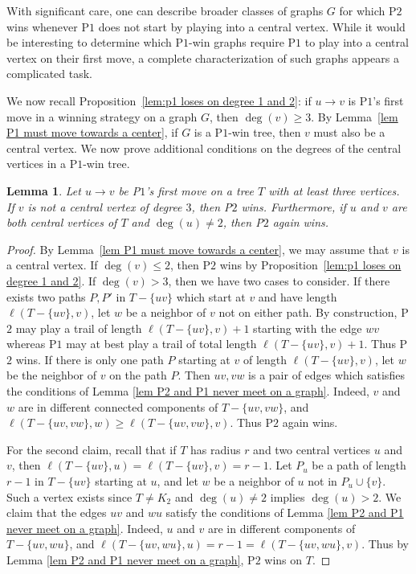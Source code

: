 \documentclass{article}
\theoremstyle{plain}
\newtheorem{lemma}[theorem]{Lemma}
\theoremstyle{definition}
\newcommand{\MaxTrail}{\ell}
\def\pone{{\rm{P}\ensuremath{1}}}
\def\ptwo{{\rm{P}\ensuremath{2}}}
\def\poneposs{{\rm{P}\ensuremath{1}'s}}
\begin{document}
With significant care, one can describe broader classes of graphs $G$ for which \ptwo{} wins whenever \pone{} does not start by playing into a central vertex.
While it would be interesting to determine which \pone{}-win graphs require \pone{} to play into a central vertex on their first move, a complete characterization of such graphs appears a complicated task.

We now recall Proposition~\ref{lem:p1 loses on degree 1 and 2}: if $u \to v$ is \poneposs{} first move in a winning strategy on a graph $G$, then $\deg(v) \geq 3$.
By Lemma~\ref{lem P1 must move towards a center}, if $G$ is a \pone{}-win tree, then $v$ must also be a central vertex.
We now prove additional conditions on the degrees of the central vertices in a \pone{}-win tree.

\begin{lemma}\label{lemma central vertices general}
    Let $u\to v$ be \poneposs{} first move on a tree $T$ with at least three vertices. If $v$ is not a central vertex of degree $3$, then \ptwo{} wins. Furthermore, if $u$ and $v$ are both central vertices of $T$ and $\deg(u) \neq 2$, then \ptwo{} again wins.
\end{lemma}
\begin{proof}
    By Lemma~\ref{lem P1 must move towards a center}, we may assume that $v$ is a central vertex. If $\deg(v) \leq 2$, then \ptwo{} wins by Proposition~\ref{lem:p1 loses on degree 1 and 2}. If $\deg(v) > 3$, then we have two cases to consider. If there exists two paths $P,P'$ in $T - \{uv\}$ which start at $v$ and have length $\MaxTrail(T - \{uv\},v)$, let $w$ be a neighbor of $v$ not on either path. By construction, \ptwo{} may play a trail of length $\MaxTrail(T - \{uv\}, v) + 1$ starting with the edge $wv$  whereas \pone{} may at best play a trail of total length $\MaxTrail(T - \{uv\}, v) + 1$. Thus \ptwo{} wins. If there is only one path $P$ starting at $v$ of length $\MaxTrail(T - \{uv\},v)$, let $w$ be the neighbor of $v$ on the path $P$. Then $uv,vw$ is a pair of edges which satisfies the conditions of Lemma \ref{lem P2 and P1 never meet on a graph}. Indeed, $v$ and $w$ are in different connected components of $T - \{uv, vw\}$, and $\MaxTrail(T - \{uv, vw\},w)  \geq \MaxTrail(T - \{uv, vw\},v)$. Thus \ptwo{} again wins. 

    For the second claim, recall that if $T$ has radius $r$ and two central vertices $u$ and $v$, then $\MaxTrail(T - \{uv\},u) = \MaxTrail(T - \{uv\},v) = r - 1$. Let $P_u$ be a path of length $r - 1$ in $T - \{uv\}$ starting at $u$, and let $w$ be a neighbor of $u$ not in $P_u \cup \{v\}$. Such a vertex exists since $T \neq K_2$ and $\deg(u) \neq 2$ implies $\deg(u) > 2$. We claim that the edges $uv$ and $wu$ satisfy the conditions of Lemma \ref{lem P2 and P1 never meet on a graph}. Indeed, $u$ and $v$ are in different components of $T - \{uv, wu\}$, and $\MaxTrail(T - \{uv, wu\},u) = r - 1 = \MaxTrail(T - \{uv, wu\},v) $. Thus by Lemma \ref{lem P2 and P1 never meet on a graph}, \ptwo{} wins on $T$.
\end{proof}
\end{document}
